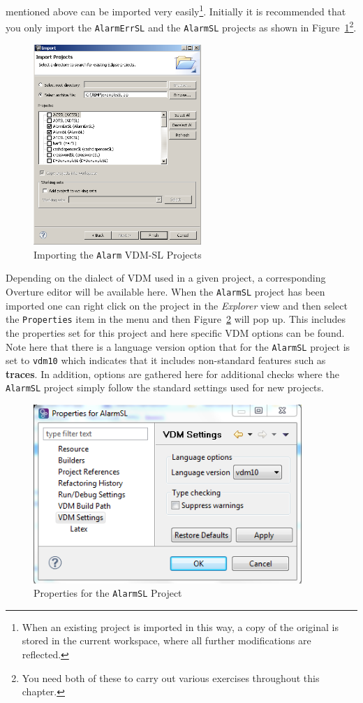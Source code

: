 mentioned above can be imported very easily\footnote{When an existing project is imported in this way, a copy of the original is stored in the current workspace, where all further modifications are reflected.}. Initially it is recommended that you only import the \texttt{AlarmErrSL} and the \texttt{AlarmSL} projects as shown in Figure~\ref{fig:importalarm}\footnote{You need both of these to carry out various exercises throughout this chapter.}.
%
\begin{figure}[!htb]
\begin{center}
  \includegraphics[width=2.5in]{figures/importalarm}
  \caption[labelInTOC]{Importing the \texttt{Alarm} VDM-SL Projects}
  \label{fig:importalarm}
\end{center}
\end{figure}
%
Depending on the dialect of VDM used in a given project, a corresponding Overture editor will be available here. When the \texttt{AlarmSL} project has been imported one can right click on the
project in the \emph{Explorer} view and then select the \texttt{Properties} item in the menu and then
Figure~\ref{fig:settings} will pop up. This includes the properties set for this project and here specific VDM options can be found. Note here that there is a language version option that for the \texttt{AlarmSL} project is set to \texttt{vdm10} which indicates that it includes non-standard features such as {\bf\ttfamily traces}. In addition, options are gathered here for additional checks where the \texttt{AlarmSL} project simply follow the standard settings used for new projects.
%
\begin{figure}[!htb]
\begin{center}
  \includegraphics[width=4.0in]{figures/settings}
  \caption[labelInTOC]{Properties for the \texttt{AlarmSL} Project}
  \label{fig:settings}
\end{center}
\end{figure}
